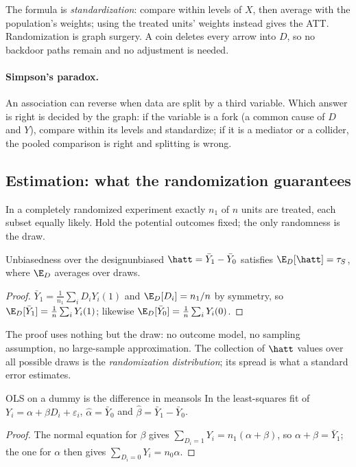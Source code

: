 \documentclass[11pt]{article}
\begin{document}
The formula is \emph{standardization}: compare within levels of $X$, then average with the population's
weights; using the treated units' weights instead gives the ATT. Randomization is graph surgery. A coin
deletes every arrow into $D$, so no backdoor paths remain and no adjustment is needed.

\paragraph{Simpson's paradox.} An association can reverse when data are split by a third variable. Which
answer is right is decided by the graph: if the variable is a fork (a common cause of $D$ and $Y$), compare
within its levels and standardize; if it is a mediator or a collider, the pooled comparison is right and
splitting is wrong.

\subsection{Estimation: what the randomization guarantees}

In a completely randomized experiment exactly $n_1$ of $n$ units are treated, each subset equally likely.
Hold the potential outcomes fixed; the only randomness is the draw.

\begin{prop}{Unbiasedness over the design}{unbiased}
$\hatt = \bar Y_1 - \bar Y_0$ satisfies $\E_D[\hatt] = \tau_S$, where $\E_D$ averages over draws.
\end{prop}
\begin{proof}
$\bar Y_1 = \frac{1}{n_1}\sum_i D_i Y_i(1)$ and $\E_D[D_i] = n_1/n$ by symmetry, so
$\E_D[\bar Y_1] = \frac1n\sum_i Y_i(1)$; likewise $\E_D[\bar Y_0] = \frac1n\sum_i Y_i(0)$.
\end{proof}

The proof uses nothing but the draw: no outcome model, no sampling assumption, no large-sample
approximation. The collection of $\hatt$ values over all possible draws is the \emph{randomization
distribution}; its spread is what a standard error estimates.

\begin{prop}{OLS on a dummy is the difference in means}{ols}
In the least-squares fit of $Y_i = \alpha + \beta D_i + \varepsilon_i$, $\hat\alpha = \bar Y_0$ and
$\hat\beta = \bar Y_1 - \bar Y_0$.
\end{prop}
\begin{proof}
The normal equation for $\beta$ gives $\sum_{D_i=1} Y_i = n_1(\alpha + \beta)$, so $\alpha + \beta = \bar Y_1$;
the one for $\alpha$ then gives $\sum_{D_i=0} Y_i = n_0\alpha$.
\end{proof}
\end{document}
